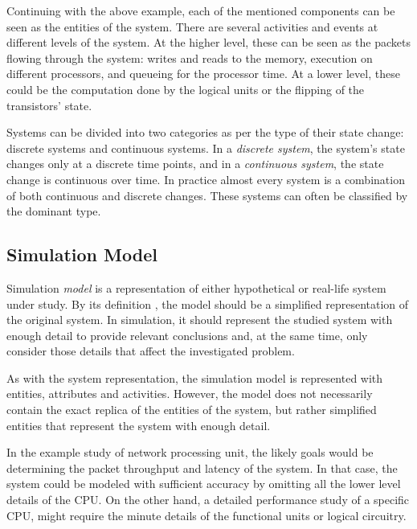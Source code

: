 Continuing with the above example, each of the mentioned components can be seen as the entities of the system. There are several activities and events at different levels of the system. At the higher level, these can be seen as the packets flowing through the system: writes and reads to the memory, execution on different processors, and queueing for the processor time. At a lower level, these could be the computation done by the logical units or the flipping of the transistors' state.

Systems can be divided into two categories as per the type of their state change: discrete systems and continuous systems. In a \emph{discrete system}, the system's state changes only at a discrete time points, and in a \emph{continuous system}, the state change is continuous over time. In practice almost every system is a combination of both continuous and discrete changes. These systems can often be classified by the dominant type. \cite{Banks:2010:DES}

\subsection{Simulation Model}
\label{sec:simulation-model}

Simulation \emph{model} is a representation of either hypothetical or real-life system under study. By its definition \cite{Encyclopedia of computer science}, the model should be a simplified representation of the original system. In simulation, it should represent the studied system with enough detail to provide relevant conclusions and, at the same time, only consider those details that affect the investigated problem. \cite{Banks:2010:DES}

As with the system representation, the simulation model is represented with entities, attributes and activities. However, the model does not necessarily contain the exact replica of the entities of the system, but rather simplified entities that represent the system with enough detail. \cite{Banks:2010:DES}

In the example study of network processing unit, the likely goals would be determining the packet throughput and latency of the system. In that case, the system could be modeled with sufficient accuracy by omitting all the lower level details of the CPU. On the other hand, a detailed performance study of a specific CPU, might require the minute details of the functional units or logical circuitry. \cite{TODO: find some simulation example for this}

